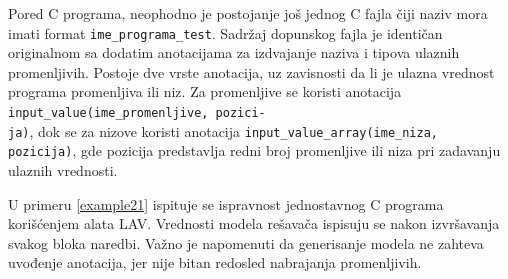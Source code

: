 \documentclass[12pt,oneside]{memoir}
\begin{document}
Pored C programa, neophodno je postojanje još jednog C fajla
čiji naziv mora imati format \texttt{ime\_programa\_test}. Sadržaj dopunskog fajla je identičan originalnom sa dodatim anotacijama za izdvajanje naziva i tipova ulaznih promenljivih. Postoje dve vrste anotacija, uz zavisnosti da li je ulazna vrednost programa promenljiva ili niz. Za promenljive se koristi anotacija 
\texttt{input\_value(ime\_promenljive, pozici-\\ja)}, dok se za nizove koristi 
anotacija \texttt{input\_value\_array(ime\_niza, pozicija)}, gde pozicija predstavlja redni broj promenljive ili niza pri zadavanju ulaznih vrednosti. 
\par
U primeru \ref{example21} ispituje se ispravnost jednostavnog C programa korišćenjem alata LAV. Vrednosti modela rešavača ispisuju se nakon izvršavanja svakog bloka naredbi. Važno je napomenuti da generisanje modela ne zahteva uvođenje anotacija, jer nije bitan redosled nabrajanja promenljivih. 
\end{document}
